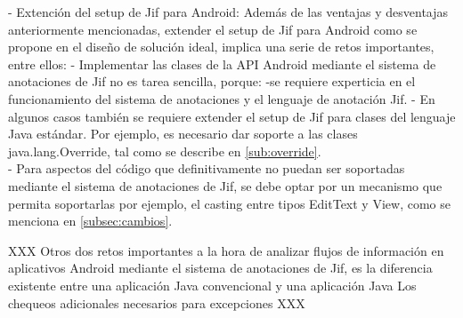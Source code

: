 - Extención del setup de Jif para Android:\newline
Además de las ventajas y desventajas anteriormente mencionadas, extender el
setup de Jif para Android como se propone en el diseño de solución ideal,
implica una serie de retos importantes, entre ellos:\newline 
- Implementar las clases de la API Android mediante el sistema de anotaciones de
Jif no es tarea sencilla, porque:
-se requiere experticia en el funcionamiento del sistema de anotaciones y el
lenguaje de anotación Jif.\newline 
- En algunos casos también se requiere extender el setup de Jif para clases del
lenguaje Java estándar. Por ejemplo, es necesario dar soporte a las clases
java.lang.Override, tal como se describe en \ref{sub:override}.\\
- Para aspectos del código que definitivamente no puedan ser soportadas
mediante el sistema de anotaciones de Jif, se debe optar por un mecanismo que
permita soportarlas por ejemplo, el casting entre tipos EditText y View, como se
menciona en \ref{subsec:cambios}.

XXX
Otros dos retos importantes a la hora de analizar flujos de
información en aplicativos Android mediante el sistema de anotaciones de Jif, es
la diferencia existente entre una aplicación Java convencional y una aplicación
Java\newline
Los chequeos adicionales necesarios para excepciones\newline
XXX

% 
% 
% 
% 
% 




